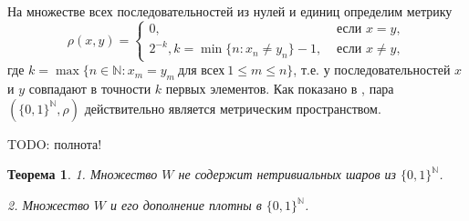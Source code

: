 \documentclass[12pt]{article}
\newtheorem{thm}{Теорема}
\def\N{{\mathbb{N}}}
\begin{document}

На множестве всех последовательностей из нулей и единиц определим метрику
$$
	\rho(x,y)=
	\begin{cases}
		0, & \mbox{~если~} x=y, \\
		2^{-k}, k = \min\{n:x_n \neq y_n\} - 1, & \mbox{~если~} x\neq y, %
	\end{cases}
$$
где $k=\max\{n\in\N : x_m=y_m \ \text{для всех} \ 1\le m\le n\}$,
т.е. у последовательностей $x$ и $y$ совпадают в точности $k$ первых элементов.
Как показано в \cite[Утверждение 2.1.8]{Edgar}, пара $(\{0,1\}^\N, \rho)$ действительно является метрическим пространством.

TODO: полнота!

\begin{thm}
1. Множество $W$ не содержит нетривиальных шаров из $\{0,1\}^\N$.

2. Множество $W$ и его дополнение плотны в $\{0,1\}^\N$.
\end{thm}
\end{document}
